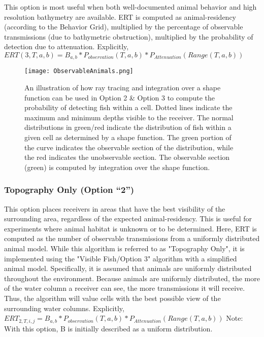 This option is most useful when both well-documented animal behavior and high resolution bathymetry are available.  ERT is computed as animal-residency (according to the Behavior Grid), multiplied by the percentage of observable transmissions (due to bathymetric obstruction), multiplied by the probability of detection due to attenuation.  \newline
Explicitly,
$ERT(3,T,a,b) =  B_{a,b} * P_{observation}(T,a,b) * P_{Attenuation}(Range(T,a,b))$

\begin{figure}[ht]
	\centering
	\texttt{[image: ObservableAnimals.png]}
	\caption{An illustration of how ray tracing and integration over a shape function can be used in Option 2 \& Option 3 to compute the probability of detecting fish within a cell.  Dotted lines indicate the maximum and minimum depths visible to the receiver.  The normal distributions in green/red indicate the distribution of fish within a given cell as determined by a shape function.  The green portion of the curve indicates the observable section of the distribution, while the red indicates the unobservable section.  The observable section (green) is computed by integration over the shape function.
		\label{observableAnimals}}
\end{figure}

\subsubsection{Topography Only (Option “2”)}
\label{bias2}
This option places receivers in areas that have the best visibility of the surrounding area, regardless of the expected animal-residency.  This is useful for experiments where animal habitat is unknown or to be determined.  Here, ERT is computed as the number of observable transmissions from a uniformly distributed animal model.  While this algorithm is referred to as "Topography Only", it is implemented using the "Visible Fish/Option 3" algorithm with a simplified animal model.  Specifically, it is assumed that animals are uniformly distributed throughout the environment.  Because animals are uniformly distributed, the more of the water column a receiver can see, the more transmissions it will receive.  Thus, the algorithm will value cells with the best possible view of the surrounding water columns.\newline
Explicitly,
$ERT_{2,T,i,j} =  B_{a,b} * P_{observation}(T,a,b) * P_{Attenuation}(Range(T,a,b))$\newline
Note: With this option, B is initially described as a uniform distribution.


